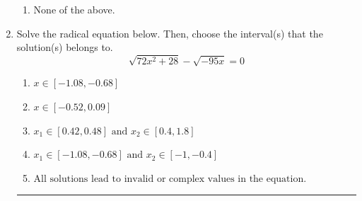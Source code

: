 \documentclass[14pt]{extbook}
\newcommand{\litem}[1]{\item#1\hspace*{-1cm}\rule{\textwidth}{0.4pt}}
\begin{document}
\begin{enumerate}
{\begin{enumerate}[label=\Alph*.]
\item None of the above.
\end{enumerate} }
\litem{
Solve the radical equation below. Then, choose the interval(s) that the solution(s) belongs to.\[ \sqrt{72 x^2 + 28} - \sqrt{-95 x} = 0 \]\begin{enumerate}[label=\Alph*.]
\item \( x \in [-1.08,-0.68] \)
\item \( x \in [-0.52,0.09] \)
\item \( x_1 \in [0.42, 0.48] \text{ and } x_2 \in [0.4,1.8] \)
\item \( x_1 \in [-1.08, -0.68] \text{ and } x_2 \in [-1,-0.4] \)
\item \( \text{All solutions lead to invalid or complex values in the equation.} \)


\end{enumerate}}
\end{enumerate}
\end{document}
